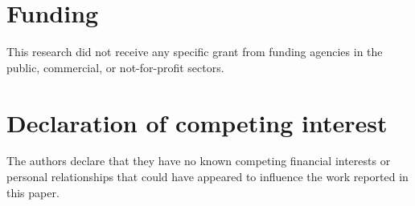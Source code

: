 \documentclass[5p,times]{elsarticle}
\begin{document}
\section*{Funding}
This research did not receive any specific grant from funding agencies in the public, commercial, or not-for-profit sectors.

\section*{Declaration of competing interest}
The authors declare that they have no known competing financial interests or personal relationships that could have appeared to influence the work reported in this paper.



\end{document}
